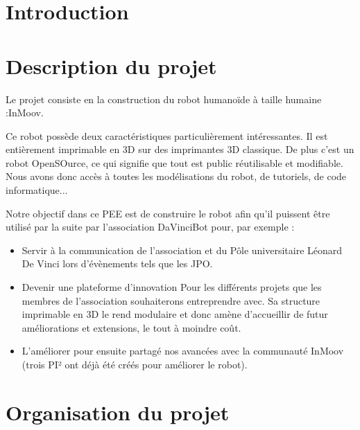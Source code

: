 \documentclass[11pt, oneside]{article}
\begin{document}
\newpage



\tableofcontents

\section{Introduction}
\vspace{0.5cm}


\section{Description du projet}
Le projet consiste en la construction du robot humanoïde à taille humaine :InMoov.
		
Ce robot possède deux caractéristiques particulièrement intéressantes. Il est entièrement imprimable en 3D sur des imprimantes 3D classique. De plus c'est un robot OpenSOurce, ce qui signifie que tout est public réutilisable et modifiable. Nous avons donc accès à toutes les modélisations du robot, de tutoriels, de code informatique...

Notre objectif dans ce PEE est de construire le robot afin qu'il puissent être utilisé par la suite par l'association DaVinciBot pour, par exemple :
	\begin{itemize}
		\item Servir à la communication de l'association et du Pôle universitaire Léonard De Vinci lors d'évènements tels que les JPO.
		\item Devenir une plateforme d'innovation Pour les différents projets que les membres de l'association souhaiterons entreprendre avec. Sa structure imprimable en 3D le rend modulaire et donc amène d'accueillir de futur améliorations et extensions, le tout à moindre coût.
		\item L'améliorer pour ensuite partagé nos avancées avec la communauté InMoov (trois PI² ont déjà été créés pour améliorer le robot).
	\end{itemize}
	
	
\section{Organisation du projet}	 
\end{document}
